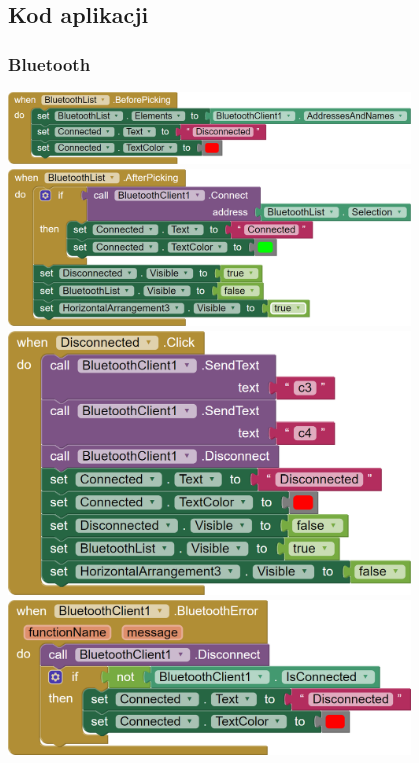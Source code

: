 \documentclass[11pt,titlepage,a4paper]{article}
\begin{document}
\subsection{Kod aplikacji}

\subsubsection{Bluetooth}

\begin{center}
    \includegraphics[width=0.8\textwidth]{img/app_src/bluetooth/BluetoothListBefore.png}
    \includegraphics[width=0.8\textwidth]{img/app_src/bluetooth/BluetoothListAfter.png}
    \includegraphics[width=0.8\textwidth]{img/app_src/bluetooth/BluetoothDisconnected.png}
    \includegraphics[width=0.8\textwidth]{img/app_src/bluetooth/BluetoothClient.png}
\end{center}
\end{document}
